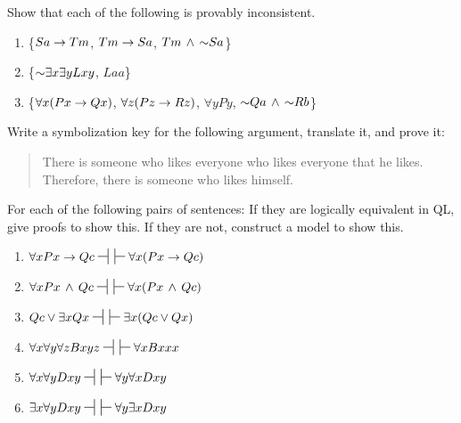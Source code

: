 \problempart
Show that each of the following is provably inconsistent.
\begin{enumerate}[label=\arabic*), topsep=0pt, parsep=0pt, itemsep=3pt]
\item \{$Sa\rightarrow Tm$, $Tm \rightarrow Sa$, $Tm \,\land\, \mathord{\sim} Sa$\}
\item \{$\mathord{\sim}\exists x \exists y Lxy$, $Laa$\}
\item \{$\forall x(Px \rightarrow Qx)$, $\forall z(Pz \rightarrow Rz)$, $\forall y Py$, $\mathord{\sim} Qa \,\land\, \mathord{\sim} Rb$\}
\end{enumerate}




\problempart
\label{pr.likes}
Write a symbolization key for the following argument, translate it, and prove it:
\begin{quote}
There is someone who likes everyone who likes everyone that he likes. Therefore, there is someone who likes himself.
\end{quote}





\problempart
\label{pr.QLequivornot}
For each of the following pairs of sentences: If they are logically equivalent in QL, give proofs to show this. If they are not, construct a model to show this.
\begin{enumerate}[label=\arabic*), topsep=0pt, parsep=0pt, itemsep=3pt]
\item $\forall x Px \eif Qc \nsststile{}{} \hspace{.5em} \sststile{}{}\forall x (Px \eif Qc)$
\item $\forall x Px \eand Qc\nsststile{}{} \hspace{.5em} \sststile{}{}\forall x (Px \eand Qc)$
\item $Qc \eor \exists x Qx\nsststile{}{} \hspace{.5em} \sststile{}{}\exists x (Qc \eor Qx)$
\item $\forall x\forall y \forall z Bxyz\nsststile{}{} \hspace{.5em} \sststile{}{}\forall x Bxxx$
\item $\forall x\forall y Dxy\nsststile{}{} \hspace{.5em} \sststile{}{}\forall y\forall x Dxy$
\item $\exists x\forall y Dxy\nsststile{}{} \hspace{.5em} \sststile{}{}\forall y\exists x Dxy$
\end{enumerate}

